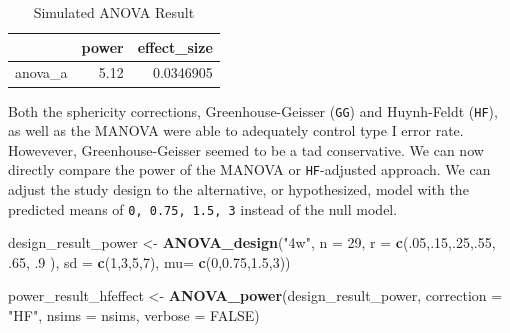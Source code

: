 \documentclass[
]{book}
\newenvironment{Shaded}{\begin{snugshade}}{\end{snugshade}}
\newcommand{\DataTypeTok}[1]{\textcolor[rgb]{0.13,0.29,0.53}{#1}}
\newcommand{\DecValTok}[1]{\textcolor[rgb]{0.00,0.00,0.81}{#1}}
\newcommand{\FloatTok}[1]{\textcolor[rgb]{0.00,0.00,0.81}{#1}}
\newcommand{\KeywordTok}[1]{\textcolor[rgb]{0.13,0.29,0.53}{\textbf{#1}}}
\newcommand{\NormalTok}[1]{#1}
\newcommand{\OtherTok}[1]{\textcolor[rgb]{0.56,0.35,0.01}{#1}}
\newcommand{\StringTok}[1]{\textcolor[rgb]{0.31,0.60,0.02}{#1}}
\begin{document}
\begin{table}[!h]

\caption{\label{tab:unnamed-chunk-139}Simulated ANOVA Result}
\centering
\begin{tabular}[t]{l|r|r}
\hline
  & power & effect\_size\\
\hline
anova\_a & 5.12 & 0.0346905\\
\hline
\end{tabular}
\end{table}

\newpage

Both the sphericity corrections, Greenhouse-Geisser (\texttt{GG}) and Huynh-Feldt (\texttt{HF}), as well as the MANOVA were able to adequately control type I error rate. Howevever, Greenhouse-Geisser seemed to be a tad conservative. We can now directly compare the power of the MANOVA or \texttt{HF}-adjusted approach. We can adjust the study design to the alternative, or hypothesized, model with the predicted means of \texttt{0,\ 0.75,\ 1.5,\ 3} instead of the null model.

\begin{Shaded}
\begin{Highlighting}[]
\NormalTok{design_result_power <-}\StringTok{ }\KeywordTok{ANOVA_design}\NormalTok{(}\StringTok{"4w"}\NormalTok{,}
                              \DataTypeTok{n =} \DecValTok{29}\NormalTok{,}
                              \DataTypeTok{r =} \KeywordTok{c}\NormalTok{(.}\DecValTok{05}\NormalTok{,.}\DecValTok{15}\NormalTok{,.}\DecValTok{25}\NormalTok{,.}\DecValTok{55}\NormalTok{, }\FloatTok{.65}\NormalTok{, }\FloatTok{.9}
\NormalTok{                              ),}
                              \DataTypeTok{sd =} \KeywordTok{c}\NormalTok{(}\DecValTok{1}\NormalTok{,}\DecValTok{3}\NormalTok{,}\DecValTok{5}\NormalTok{,}\DecValTok{7}\NormalTok{),}
                              \DataTypeTok{mu=} \KeywordTok{c}\NormalTok{(}\DecValTok{0}\NormalTok{,}\FloatTok{0.75}\NormalTok{,}\FloatTok{1.5}\NormalTok{,}\DecValTok{3}\NormalTok{))}

\NormalTok{power_result_hfeffect <-}\StringTok{ }\KeywordTok{ANOVA_power}\NormalTok{(design_result_power, }
                                     \DataTypeTok{correction =} \StringTok{"HF"}\NormalTok{,}
                                     \DataTypeTok{nsims =}\NormalTok{ nsims, }
                                     \DataTypeTok{verbose =} \OtherTok{FALSE}\NormalTok{)}
\end{Highlighting}
\end{Shaded}
\end{document}
